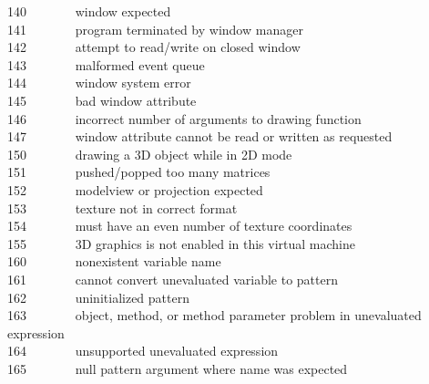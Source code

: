 140 \ \ \ \ \ \ \ window expected\\
141 \ \ \ \ \ \ \ program terminated by window manager\\
142 \ \ \ \ \ \ \ attempt to read/write on closed window\\
143 \ \ \ \ \ \ \ malformed event queue\\
144 \ \ \ \ \ \ \ window system error\\
145 \ \ \ \ \ \ \ bad window attribute\\
146 \ \ \ \ \ \ \ incorrect number of arguments to drawing
function\\
147 \ \ \ \ \ \ \ window attribute cannot be read or written as requested\\
150 \ \ \ \ \ \ \ drawing a 3D object while in 2D mode\\
151 \ \ \ \ \ \ \ pushed/popped too many matrices\\
152 \ \ \ \ \ \ \ modelview or projection expected\\
153 \ \ \ \ \ \ \ texture not in correct format\\
154 \ \ \ \ \ \ \ must have an even number of texture coordinates\\
155 \ \ \ \ \ \ \ 3D graphics is not enabled in this virtual machine\\
160 \ \ \ \ \ \ \ nonexistent variable name\\
161 \ \ \ \ \ \ \ cannot convert unevaluated variable to pattern\\
162 \ \ \ \ \ \ \ uninitialized pattern\\
163 \ \ \ \ \ \ \ object, method, or method parameter problem in
unevaluated expression\\
164 \ \ \ \ \ \ \ unsupported unevaluated expression\\
165 \ \ \ \ \ \ \ null pattern argument where name was expected\\
